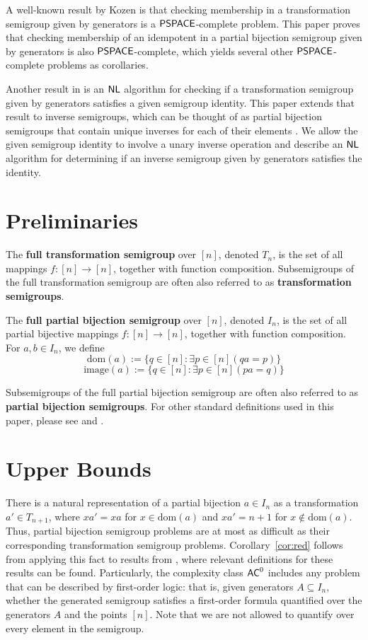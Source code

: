 \documentclass{amsart}
\newcommand{\dom}{\mathrm{dom}}
\newcommand{\image}{\mathrm{image}}
\newcommand{\NL}{\ensuremath\mathsf{NL}}
\newcommand{\PSPACE}{\ensuremath\mathsf{PSPACE}}
\newcommand{\AC}{\ensuremath\mathsf{AC}}
\theoremstyle{remark}
\numberwithin{equation}{section}
\begin{document}
A well-known result by Kozen \cite{KO:LBN} is that checking membership in a transformation semigroup given by generators is a $\PSPACE$-complete problem. This paper proves that checking membership of an idempotent in a partial bijection semigroup given by generators is also $\PSPACE$-complete, which yields several other $\PSPACE$-complete problems as corollaries.

Another result in \cite{FJ:CP} is an $\NL$ algorithm for checking if a transformation semigroup given by generators satisfies a given semigroup identity. This paper extends that result to inverse semigroups, which can be thought of as partial bijection semigroups that contain unique inverses for each of their elements \cite[Thm 5.1.7]{HO:FST}. We allow the given semigroup identity to involve a unary inverse operation and describe an $\NL$ algorithm for determining if an inverse semigroup given by generators satisfies the identity.

\section{Preliminaries} \label{NotationSection}

The {\bf full transformation semigroup} over $[n]$, denoted $T_n$, is the set of all mappings $f \colon [n] \to [n]$, together with function composition. Subsemigroups of the full transformation semigroup are often also referred to as {\bf transformation semigroups}.

The {\bf full partial bijection semigroup} over $[n]$, denoted $I_n$, is the set of all partial bijective mappings $f \colon [n] \to [n]$, together with function composition. For $a,b \in I_n$, we define
\[ \dom(a) := \{q \in [n]: \exists p \in [n](qa = p)\} \]
\[\image(a) := \{q \in [n] : \exists p \in [n] (pa = q)\}\]

Subsemigroups of the full partial bijection semigroup are often also referred to as {\bf partial bijection semigroups}. For other standard definitions used in this paper, please see \cite{HO:FST} and \cite{CP:AT}.

\section{Upper Bounds}
There is a natural representation of a partial bijection $a \in I_n$ as a transformation $a' \in T_{n+1}$, where $xa' = xa$ for $x \in \dom(a)$ and $xa' = n+1$ for $x \not \in \dom(a)$. Thus, partial bijection semigroup problems are at most as difficult as their corresponding transformation semigroup problems. Corollary~\ref{cor:red} follows from applying this fact to results from \cite{FJ:CP}, where relevant definitions for these results can be found. Particularly, the complexity class $\AC^0$ includes any problem that can be described by first-order logic: that is, given generators $A \subseteq I_n$, whether the generated semigroup satisfies a first-order formula quantified over the generators $A$ and the points $[n]$. Note that we are not allowed to quantify over every element in the semigroup.
\end{document}
